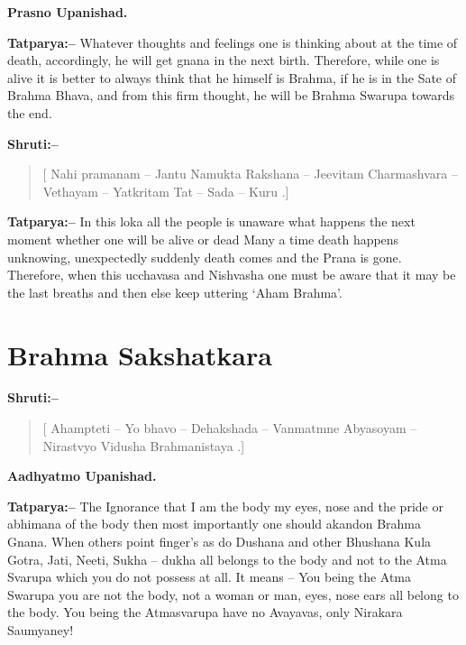 \begin{flushright}
\textbf{Prasno Upanishad.}
\end{flushright}

\textbf{Tatparya:–} Whatever thoughts and feelings one is thinking about at the time of death, accordingly, he will get gnana in the next birth. Therefore, while one is alive it is better to always think that he himself is Brahma, if he is in the Sate of Brahma Bhava, and from this firm thought, he will be Brahma Swarupa towards the end.

\textbf{Shruti:–}

\begin{verse}
[ Nahi pramanam – Jantu Namukta Rakshana – Jeevitam  Charmashvara – Vethayam – Yatkritam Tat – Sada – Kuru .]
\end{verse}

\textbf{Tatparya:–} In this loka all the people is unaware what happens the next moment whether one will be alive or dead Many a time death happens unknowing, unexpectedly suddenly death comes and the Prana is gone. Therefore, when this ucchavasa and Nishvasha one must be aware that it may be the last breaths and then else keep uttering ‘Aham Brahma’.

\chapter{Brahma Sakshatkara}

\textbf{Shruti:–}

\begin{verse}
[ Ahampteti – Yo bhavo – Dehakshada – Vanmatmne  Abyasoyam – Nirastvyo Vidusha Brahmanistaya .]
\end{verse}

\begin{flushright}
\textbf{Aadhyatmo Upanishad.}
\end{flushright}

\textbf{Tatparya:–} The Ignorance that I am the body my eyes, nose and the pride or abhimana of the body then most importantly one should akandon Brahma Gnana. When others point finger's as do Dushana and other Bhushana Kula Gotra, Jati, Neeti, Sukha – dukha all belongs to the body and not to the Atma Svarupa which you do not possess at all. It means – You being the Atma Swarupa you are not the body, not a woman or man, eyes, nose ears all belong to the body. You being the Atmasvarupa have no Avayavas, only Nirakara Saumyaney!

